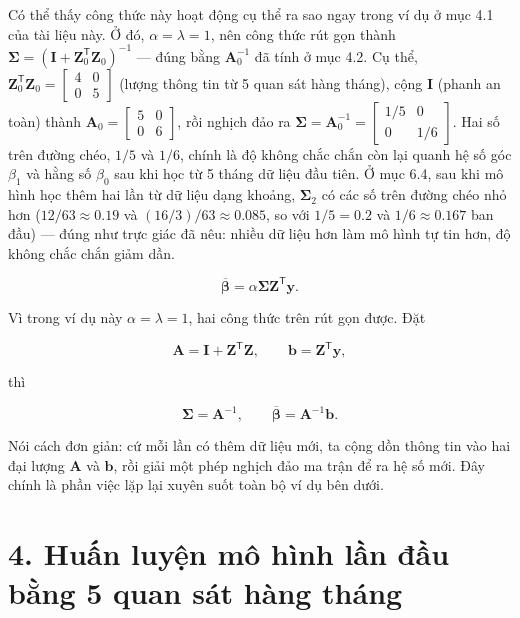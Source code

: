 \documentclass[12pt]{article}
\begin{document}
Có thể thấy công thức này hoạt động cụ thể ra sao ngay trong ví dụ ở mục 4.1 của tài liệu này. Ở đó, $\alpha=\lambda=1$, nên công thức rút gọn thành $\boldsymbol{\Sigma}=(\boldsymbol{I}+\boldsymbol{Z}_0^{\mathsf{T}}\boldsymbol{Z}_0)^{-1}$ — đúng bằng $\boldsymbol{A}_0^{-1}$ đã tính ở mục 4.2. Cụ thể, $\boldsymbol{Z}_0^{\mathsf{T}}\boldsymbol{Z}_0=\begin{bmatrix}4&0\\0&5\end{bmatrix}$ (lượng thông tin từ 5 quan sát hàng tháng), cộng $\boldsymbol{I}$ (phanh an toàn) thành $\boldsymbol{A}_0=\begin{bmatrix}5&0\\0&6\end{bmatrix}$, rồi nghịch đảo ra $\boldsymbol{\Sigma}=\boldsymbol{A}_0^{-1}=\begin{bmatrix}1/5&0\\0&1/6\end{bmatrix}$. Hai số trên đường chéo, $1/5$ và $1/6$, chính là độ không chắc chắn còn lại quanh hệ số góc $\beta_1$ và hằng số $\beta_0$ sau khi học từ 5 tháng dữ liệu đầu tiên. Ở mục 6.4, sau khi mô hình học thêm hai lần từ dữ liệu dạng khoảng, $\boldsymbol{\Sigma}_2$ có các số trên đường chéo nhỏ hơn ($12/63\approx0.19$ và $(16/3)/63\approx0.085$, so với $1/5=0.2$ và $1/6\approx0.167$ ban đầu) — đúng như trực giác đã nêu: nhiều dữ liệu hơn làm mô hình tự tin hơn, độ không chắc chắn giảm dần.

\[
\overline{\boldsymbol{\beta}}
=
\alpha\boldsymbol{\Sigma}
\boldsymbol{Z}^{\mathsf{T}}\boldsymbol{y}.
\]

Vì trong ví dụ này $\alpha=\lambda=1$, hai công thức trên rút gọn được. Đặt

\[
\boldsymbol{A}
=
\boldsymbol{I}
+
\boldsymbol{Z}^{\mathsf{T}}\boldsymbol{Z},
\qquad
\boldsymbol{b}
=
\boldsymbol{Z}^{\mathsf{T}}\boldsymbol{y},
\]

thì

\[
\boldsymbol{\Sigma}=\boldsymbol{A}^{-1},
\qquad
\overline{\boldsymbol{\beta}}=\boldsymbol{A}^{-1}\boldsymbol{b}.
\]

Nói cách đơn giản: cứ mỗi lần có thêm dữ liệu mới, ta cộng dồn thông tin vào hai đại lượng $\boldsymbol{A}$ và $\boldsymbol{b}$, rồi giải một phép nghịch đảo ma trận để ra hệ số mới. Đây chính là phần việc lặp lại xuyên suốt toàn bộ ví dụ bên dưới.

\section{4. Huấn luyện mô hình lần đầu bằng 5 quan sát hàng tháng}
\end{document}
